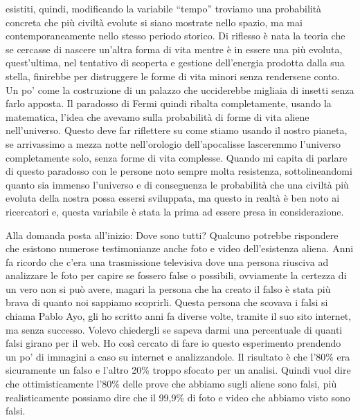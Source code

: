 \documentclass[12pt]{book} %
\begin{document}
esistiti, quindi, modificando la variabile “tempo” troviamo una probabilità concreta che più civiltà evolute si siano
mostrate nello spazio, ma mai contemporaneamente nello stesso periodo storico. Di riflesso è nata la teoria che se
cercasse di nascere un'altra forma di vita mentre è in essere una più evoluta,
quest'ultima, nel tentativo di scoperta e gestione dell'energia prodotta
dalla sua stella, finirebbe per distruggere le forme di vita minori senza rendersene conto. Un po' come la costruzione
di un palazzo che ucciderebbe migliaia di insetti senza farlo apposta. Il paradosso di Fermi quindi ribalta
completamente, usando la matematica, l'idea che avevamo sulla probabilità di forme di vita aliene
nell'universo. Questo deve far riflettere su come stiamo usando il nostro pianeta, se arrivassimo
a mezza notte nell'orologio dell'apocalisse lasceremmo
l'universo completamente solo, senza forme di vita complesse. Quando mi capita di parlare di
questo paradosso con le persone noto sempre molta resistenza, sottolineandomi quanto sia immenso
l'universo e di conseguenza le probabilità che una civiltà più evoluta della nostra possa essersi
sviluppata, ma questo in realtà è ben noto ai ricercatori e, questa variabile è stata la prima ad essere presa in
considerazione.

Alla domanda posta all'inizio: Dove sono tutti? Qualcuno potrebbe rispondere che esistono numerose
testimonianze anche foto e video dell'esistenza aliena. Anni fa ricordo che
c'era una trasmissione televisiva dove una persona riusciva ad analizzare le foto per capire se
fossero false o possibili, ovviamente la certezza di un vero non si può avere, magari la persona che ha creato il falso
è stata più brava di quanto noi sappiamo scoprirli. Questa persona che scovava i falsi si chiama Pablo Ayo, gli ho
scritto anni fa diverse volte, tramite il suo sito internet, ma senza successo. Volevo chiedergli se sapeva darmi una
percentuale di quanti falsi girano per il web. Ho così cercato di fare io questo esperimento prendendo un po' di
immagini a caso su internet e analizzandole. Il risultato è che l'80\% era sicuramente un falso e
l'altro 20\% troppo sfocato per un analisi. Quindi vuol dire che ottimisticamente
l'80\% delle prove che abbiamo sugli aliene sono falsi, più realisticamente possiamo dire che il
99,9\% di foto e video che abbiamo visto sono falsi.
\end{document}
